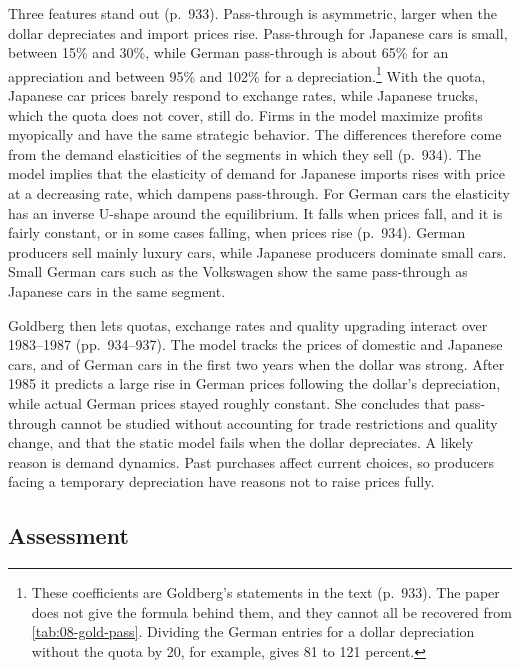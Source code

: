 Three features stand out (p.~933). Pass-through is asymmetric, larger when the dollar depreciates and import
prices rise. Pass-through for Japanese cars is small, between 15\% and 30\%, while German pass-through is about
65\% for an appreciation and between 95\% and 102\% for a depreciation.\footnote{These coefficients are
Goldberg's statements in the text (p.~933). The paper does not give the formula behind them, and they cannot
all be recovered from \cref{tab:08-gold-pass}. Dividing the German entries for a dollar depreciation without
the quota by 20, for example, gives 81 to 121 percent.} With the quota, Japanese car prices
barely respond to exchange rates, while Japanese trucks, which the quota does not cover, still do. Firms in the
model maximize profits myopically and have the same strategic behavior. The differences therefore come from
the demand elasticities of the segments in which they sell (p.~934). The model implies that the elasticity of
demand for Japanese imports rises with price at a decreasing rate, which dampens pass-through. For German cars
the elasticity has an inverse U-shape around the equilibrium. It falls when prices fall, and it is fairly
constant, or in some cases falling, when prices rise (p.~934). German producers sell mainly luxury cars, while
Japanese producers dominate small cars. Small German cars such as the Volkswagen show the same
pass-through as Japanese cars in the same segment.

Goldberg then lets quotas, exchange rates and quality upgrading interact over 1983--1987 (pp.~934--937). The
model tracks the prices of domestic and Japanese cars, and of German cars in the first two years when the dollar
was strong. After 1985 it predicts a large rise in German prices following the dollar's depreciation, while
actual German prices stayed roughly constant. She concludes that pass-through cannot be studied without
accounting for trade restrictions and quality change, and that the static model fails when the dollar
depreciates. A likely reason is demand dynamics. Past purchases affect current choices, so producers facing a
temporary depreciation have reasons not to raise prices fully.

\subsection{Assessment}\label{sec:08-goldberg-assess}

